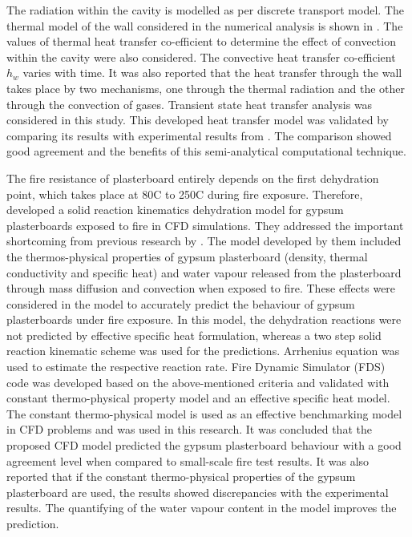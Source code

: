 The radiation within the cavity is modelled as per discrete transport model. The thermal model of the wall considered in the numerical analysis is shown in . The values of thermal heat transfer co-efficient to determine the effect of convection within the cavity were also considered. The convective heat transfer co-efficient $h_w$ varies with time. It was also reported that the heat transfer through the wall takes place by two mechanisms, one through the thermal radiation and the other through the convection of gases. Transient state heat transfer analysis was considered in this study. This developed heat transfer model was validated by comparing its results with experimental results from \citet{Tofilo2005}. The comparison showed good agreement and the benefits of this semi-analytical computational technique. 

The fire resistance of plasterboard entirely depends on the first dehydration point, which takes place at 80\degree C to 250\degree C during fire exposure. Therefore, \citet{Kolaitis2013} developed a solid reaction kinematics dehydration model for gypsum plasterboards exposed to fire in CFD simulations. They addressed the important shortcoming from previous research by \citet{Horvat2009}. The model developed by them included the thermos-physical properties of gypsum plasterboard (density, thermal conductivity and specific heat) and water vapour released from the plasterboard through mass diffusion and convection when exposed to fire. These effects were considered in the model to accurately predict the behaviour of gypsum plasterboards under fire exposure. In this model, the dehydration reactions were not predicted by effective specific heat formulation, whereas a two step solid reaction kinematic scheme was used for the predictions. Arrhenius equation was used to estimate the respective reaction rate. Fire Dynamic Simulator (FDS) code was developed based on the above-mentioned criteria and validated with constant thermo-physical property model and an effective specific heat model. The constant thermo-physical model is used as an effective benchmarking model in CFD problems and was used in this research. It was concluded that the proposed CFD model predicted the gypsum plasterboard behaviour with a good agreement level when compared to small-scale fire test results. It was also reported that if the constant thermo-physical properties of the gypsum plasterboard are used, the results showed discrepancies with the experimental results. The quantifying of the water vapour content in the model improves the prediction. 

